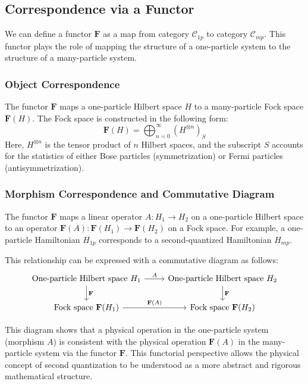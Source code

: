 \documentclass[uplatex,a4j,12pt,dvipdfmx]{jsarticle}
\begin{document}
\subsection{Correspondence via a Functor}

We can define a functor $\mathbf{F}$ as a map from category $\mathcal{C}_{1p}$ to category $\mathcal{C}_{mp}$. This functor plays the role of mapping the structure of a one-particle system to the structure of a many-particle system.

\subsubsection{Object Correspondence}

The functor $\mathbf{F}$ maps a one-particle Hilbert space $H$ to a many-particle Fock space $\mathbf{F}(H)$. The Fock space is constructed in the following form:
$$\mathbf{F}(H) = \bigoplus_{n=0}^{\infty} \left( H^{\otimes n} \right)_S$$
Here, $H^{\otimes n}$ is the tensor product of $n$ Hilbert spaces, and the subscript $S$ accounts for the statistics of either Bose particles (symmetrization) or Fermi particles (antisymmetrization).

\subsubsection{Morphism Correspondence and Commutative Diagram}

The functor $\mathbf{F}$ maps a linear operator $A: H_1 \to H_2$ on a one-particle Hilbert space to an operator $\mathbf{F}(A): \mathbf{F}(H_1) \to \mathbf{F}(H_2)$ on a Fock space. For example, a one-particle Hamiltonian $H_{1p}$ corresponds to a second-quantized Hamiltonian $H_{mp}$.

This relationship can be expressed with a commutative diagram as follows:
$$
	\begin{tikzcd}
		\text{One-particle Hilbert space } H_1 \arrow[r, "A"] \arrow[d, "\mathbf{F}"] & \text{One-particle Hilbert space } H_2 \arrow[d, "\mathbf{F}"] \\
		\text{Fock space } \mathbf{F}(H_1) \arrow[r, "\mathbf{F}(A)"] & \text{Fock space } \mathbf{F}(H_2)
	\end{tikzcd}
$$

This diagram shows that a physical operation in the one-particle system (morphism $A$) is consistent with the physical operation $\mathbf{F}(A)$ in the many-particle system via the functor $\mathbf{F}$. This functorial perspective allows the physical concept of second quantization to be understood as a more abstract and rigorous mathematical structure.
\end{document}
